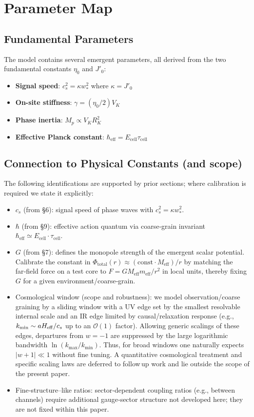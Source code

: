 \documentclass[11pt]{article}
\begin{document}
\section{Parameter Map}

\subsection{Fundamental Parameters}

The model contains several emergent parameters, all derived from the two fundamental constants $\eta_0$ and $J'_0$:
\begin{itemize}
\item \textbf{Signal speed}: $c_s^2 = \kappa w_*^2$ where $\kappa = J'_0$
\item \textbf{On-site stiffness}: $\gamma = (\eta_0/2)V_K$
\item \textbf{Phase inertia}: $M_p \propto V_K R_K^2$
\item \textbf{Effective Planck constant}: $\hbar_{\mathrm{eff}} = E_{\text{cell}} \tau_{\text{cell}}$
\end{itemize}

\subsection{Connection to Physical Constants (and scope)}

The following identifications are supported by prior sections; where calibration is required we state it explicitly:
\begin{itemize}
\item $c_s$ (from §6): signal speed of phase waves with $c_s^2 = \kappa w_*^2$.
\item $\hbar$ (from §9): effective action quantum via coarse‑grain invariant $\hbar_{\mathrm{eff}} \simeq E_{\text{cell}} \cdot \tau_{\text{cell}}$.
\item $G$ (from §7): defines the monopole strength of the emergent scalar potential. Calibrate the constant in $\Phi_{\text{total}}(r) \approx (\text{const} \cdot M_{\text{eff}})/r$ by matching the far‑field force on a test core to $F = G M_{\text{eff}} m_{\text{eff}} / r^2$ in local units, thereby fixing $G$ for a given environment/coarse‑grain.
\item Cosmological window (scope and robustness): we model observation/coarse\,graining by a sliding window with a UV edge set by the smallest resolvable internal scale and an IR edge limited by causal/relaxation response (e.g., $k_{\min}\sim a H_{\rm eff}/c_s$ up to an $\mathcal O(1)$ factor). Allowing generic scalings of these edges, departures from $w=-1$ are suppressed by the large logarithmic bandwidth $\ln(k_{\max}/k_{\min})$. Thus, for broad windows one naturally expects $|w+1|\ll 1$ without fine tuning. A quantitative cosmological treatment and specific scaling laws are deferred to follow\,up work and lie outside the scope of the present paper.
\item Fine‑structure–like ratios: sector‑dependent coupling ratios (e.g., between channels) require additional gauge‑sector structure not developed here; they are not fixed within this paper.
\end{itemize}
\end{document}
